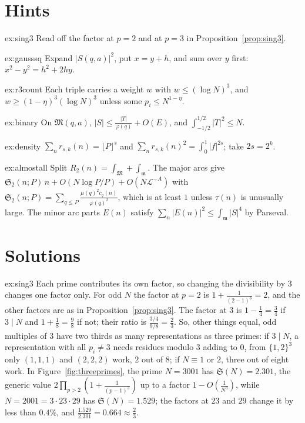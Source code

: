 \section{Hints}

\begin{hint}{ex:sing3}
Read off the factor at $p=2$ and at $p=3$ in Proposition~\ref{prop:sing3}.
\end{hint}

\begin{hint}{ex:gausssq}
Expand $|S(q,a)|^2$, put $x=y+h$, and sum over $y$ first: $x^2-y^2=h^2+2hy$.
\end{hint}

\begin{hint}{ex:r3count}
Each triple carries a weight $w$ with $w\le(\log N)^3$, and $w\ge(1-\eta)^3(\log N)^3$ unless some $p_i\le N^{1-\eta}$.
\end{hint}

\begin{hint}{ex:binary}
On $\mathfrak M(q,a)$, $|S|\le\frac{|T|}{\varphi(q)}+O(E)$, and $\int_{-1/2}^{1/2}|T|^2\le N$.
\end{hint}

\begin{hint}{ex:density}
$\sum_nr_{s,k}(n)=\lfloor P\rfloor^s$ and $\sum_nr_{s,k}(n)^2=\int_0^1|f|^{2s}$; take $2s=2^k$.
\end{hint}

\begin{hint}{ex:almostall}
Split $R_2(n)=\int_{\mathfrak M}+\int_{\mathfrak m}$. The major arcs give $\mathfrak S_2(n;P)\,n+O(N\log P/P)+O(N\mathcal L^{-A})$ with $\mathfrak S_2(n;P)=\sum_{q\le P}\frac{\mu(q)^2c_q(n)}{\varphi(q)^2}$, which is at least $1$ unless $\tau(n)$ is unusually large. The minor arc parts $E(n)$ satisfy $\sum_n|E(n)|^2\le\int_{\mathfrak m}|S|^4$ by Parseval.
\end{hint}

\section{Solutions}

\begin{solution}{ex:sing3}
\idea Each prime contributes its own factor, so changing the divisibility by $3$ changes one factor only.
\writeup For odd $N$ the factor at $p=2$ is $1+\frac1{(2-1)^3}=2$, and the other factors are as in Proposition~\ref{prop:sing3}. The factor at $3$ is $1-\frac14=\frac34$ if $3\mid N$ and $1+\frac18=\frac98$ if not; their ratio is $\frac{3/4}{9/8}=\frac23$. So, other things equal, odd multiples of $3$ have two thirds as many representations as three primes: if $3\mid N$, a representation with all $p_i\ne3$ needs residues modulo $3$ adding to $0$, from $\{1,2\}^3$ only $(1,1,1)$ and $(2,2,2)$ work, $2$ out of $8$; if $N\equiv1$ or $2$, three out of eight work. In Figure~\ref{fig:threeprimes}, the prime $N=3001$ has $\mathfrak S(N)=2.301$, the generic value $2\prod_{p>2}(1+\frac1{(p-1)^3})$ up to a factor $1-O(\frac1{N^3})$, while $N=2001=3\cdot23\cdot29$ has $\mathfrak S(N)=1.529$; the factors at $23$ and $29$ change it by less than $0.4\%$, and $\frac{1.529}{2.301}=0.664\approx\frac23$.
\end{solution}

